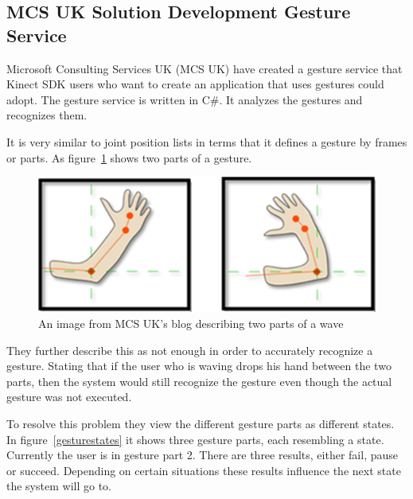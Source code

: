 \subsection{MCS UK Solution Development Gesture Service \cite{citeKey3}}
Microsoft Consulting Services UK (MCS UK) have created a gesture service that Kinect SDK users who want to create an application that uses gestures could adopt. The gesture service is written in C\#. It analyzes the gestures and recognizes them.

It is very similar to joint position lists in terms that it defines a gesture by frames or parts. As figure~\ref{wave} shows two parts of a gesture.

\begin{figure}[!htbp]
\centering
\includegraphics[width=1\textwidth]{images/wave.png}
\caption{An image from MCS UK's blog describing two parts of a wave}
\label{wave}
\end{figure}
 
They further describe this as not enough in order to accurately recognize a gesture. Stating that if the user who is waving drops his hand between the two parts, then the system would still recognize the gesture even though the actual gesture was not executed.

To resolve this problem they view the different gesture parts as different states. In figure~\ref{gesturestates} it shows three gesture parts, each resembling a state. Currently the user is in gesture part 2. There are three results, either fail, pause or succeed. Depending on certain situations these results influence the next state the system will go to.

